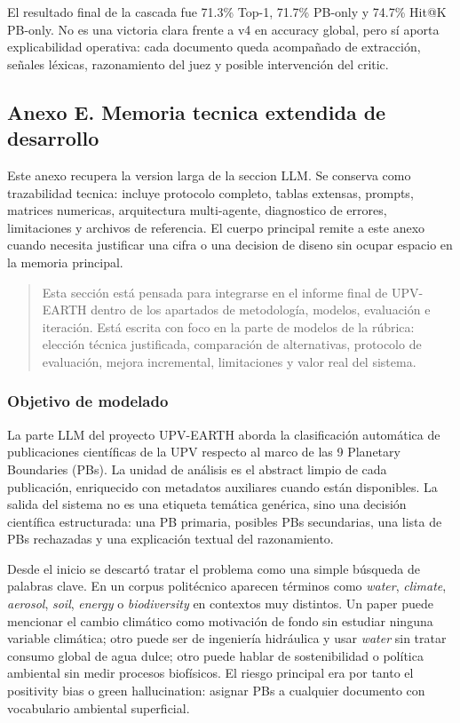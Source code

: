 El resultado final de la cascada fue 71.3\% Top-1, 71.7\% PB-only y 74.7\% Hit@K PB-only. No es una victoria clara frente a v4 en accuracy global, pero sí aporta explicabilidad operativa: cada documento queda acompañado de extracción, señales léxicas, razonamiento del juez y posible intervención del critic.


\clearpage
\subsection*{Anexo E. Memoria tecnica extendida de desarrollo}
\label{anexo:llm-extendido}

Este anexo recupera la version larga de la seccion LLM. Se conserva como trazabilidad tecnica: incluye protocolo completo, tablas extensas, prompts, matrices numericas, arquitectura multi-agente, diagnostico de errores, limitaciones y archivos de referencia. El cuerpo principal remite a este anexo cuando necesita justificar una cifra o una decision de diseno sin ocupar espacio en la memoria principal.

\begin{quote}
Esta sección está pensada para integrarse en el informe final de UPV-EARTH dentro de los apartados de metodología, modelos, evaluación e iteración. Está escrita con foco en la parte de modelos de la rúbrica: elección técnica justificada, comparación de alternativas, protocolo de evaluación, mejora incremental, limitaciones y valor real del sistema.
\end{quote}

\subsubsection*{Objetivo de modelado}

La parte LLM del proyecto UPV-EARTH aborda la clasificación automática de publicaciones científicas de la UPV respecto al marco de las 9 Planetary Boundaries (PBs). La unidad de análisis es el abstract limpio de cada publicación, enriquecido con metadatos auxiliares cuando están disponibles. La salida del sistema no es una etiqueta temática genérica, sino una decisión científica estructurada: una PB primaria, posibles PBs secundarias, una lista de PBs rechazadas y una explicación textual del razonamiento.

Desde el inicio se descartó tratar el problema como una simple búsqueda de palabras clave. En un corpus politécnico aparecen términos como \emph{water}, \emph{climate}, \emph{aerosol}, \emph{soil}, \emph{energy} o \emph{biodiversity} en contextos muy distintos. Un paper puede mencionar el cambio climático como motivación de fondo sin estudiar ninguna variable climática; otro puede ser de ingeniería hidráulica y usar \emph{water} sin tratar consumo global de agua dulce; otro puede hablar de sostenibilidad o política ambiental sin medir procesos biofísicos. El riesgo principal era por tanto el positivity bias o green hallucination: asignar PBs a cualquier documento con vocabulario ambiental superficial.

